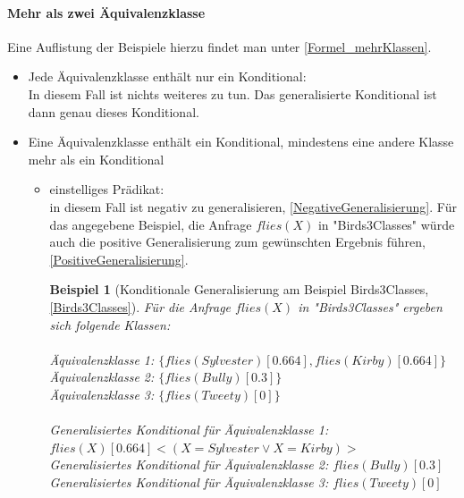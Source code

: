\documentclass[a4paper, 11pt]{book}
\newtheorem{Bsp}{Beispiel}[section]
\begin{document}
\paragraph{Mehr als zwei Äquivalenzklasse} 
Eine Auflistung der Beispiele hierzu findet man unter \ref{Formel_mehrKlassen}.
\begin{itemize}
	\item Jede Äquivalenzklasse enthält nur ein Konditional:\\
	In diesem Fall ist nichts weiteres zu tun. Das generalisierte Konditional ist dann genau dieses Konditional.
	\item Eine Äquivalenzklasse enthält ein Konditional, mindestens eine andere Klasse mehr als ein Konditional
	\begin{itemize}
		\item einstelliges Prädikat:\\
		 in diesem Fall ist negativ zu generalisieren, \ref{NegativeGeneralisierung}. Für das angegebene Beispiel, die Anfrage $ flies(X) $ in "{}Birds3Classes"{} würde auch die positive Generalisierung zum gewünschten Ergebnis führen, \ref{PositiveGeneralisierung}.
		\begin{Bsp}[Konditionale Generalisierung am Beispiel Birds3Classes, \ref{Birds3Classes}]
			Für die Anfrage $ flies(X) $ in "{}Birds3Classes"{} ergeben sich folgende Klassen:\\
			\\
			Äquivalenzklasse 1: $ \{flies(Sylvester)[0.664], flies(Kirby)[0.664]\}  $\\
			Äquivalenzklasse 2: $ \{flies(Bully)[0.3]\} $\\
			Äquivalenzklasse 3: $ \{flies(Tweety)[0]\} $\\
			\\
			\noindent
			Generalisiertes Konditional für Äquivalenzklasse 1: $ flies(X)[0.664]<(X = Sylvester \lor  X = Kirby)>$\\
			Generalisiertes  Konditional für Äquivalenzklasse 2: $ flies(Bully)[0.3] $
			Generalisiertes Konditional für Äquivalenzklasse 3: $ flies(Tweety)[0] $\\
		

\end{Bsp}
\end{itemize}
\end{itemize}
\end{document}
